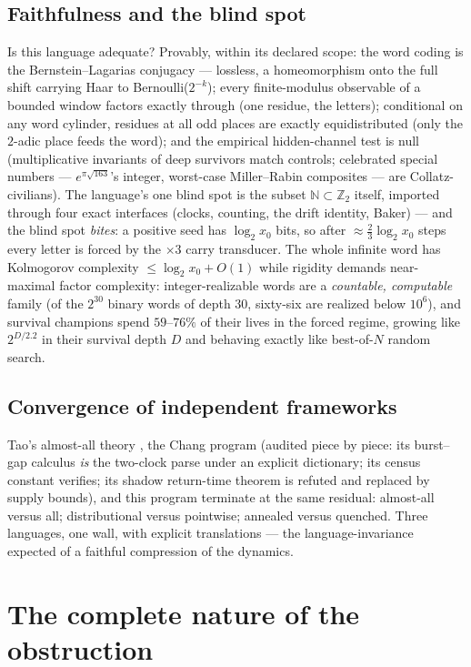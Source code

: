 \documentclass[11pt]{article}
\newcommand{\Z}{\mathbb Z}
\newcommand{\N}{\mathbb N}
\begin{document}
\subsection{Faithfulness and the blind spot}
Is this language adequate?  Provably, within its declared scope: the
word coding is the Bernstein--Lagarias conjugacy
\cite{Bernstein,BernsteinLagarias} --- lossless, a homeomorphism onto
the full shift carrying Haar to Bernoulli($2^{-k}$); every
finite-modulus observable of a bounded window factors exactly through
(one residue, the letters); conditional on any word cylinder, residues
at all odd places are exactly equidistributed (only the $2$-adic place
feeds the word); and the empirical hidden-channel test is null
(multiplicative invariants of deep survivors match controls;
celebrated special numbers --- $e^{\pi\sqrt{163}}$'s integer,
worst-case Miller--Rabin composites --- are Collatz-civilians).  The
language's one blind spot is the subset $\N\subset\Z_2$ itself,
imported through four exact interfaces (clocks, counting, the drift
identity, Baker) --- and the blind spot \emph{bites}: a positive seed
has $\log_2x_0$ bits, so after ${\approx}\tfrac23\log_2x_0$ steps
every letter is forced by the $\times3$ carry transducer.  The whole
infinite word has Kolmogorov complexity $\le\log_2x_0+O(1)$ while
rigidity demands near-maximal factor complexity: integer-realizable
words are a \emph{countable, computable} family (of the $2^{30}$
binary words of depth $30$, sixty-six are realized below $10^6$), and
survival champions spend $59$--$76\%$ of their lives in the forced
regime, growing like $2^{D/2.2}$ in their survival depth $D$ and
behaving exactly like best-of-$N$ random search.

\subsection{Convergence of independent frameworks}
Tao's almost-all theory \cite{Tao}, the Chang program \cite{Chang}
(audited piece by piece: its burst--gap calculus \emph{is} the
two-clock parse under an explicit dictionary; its census constant
verifies; its shadow return-time theorem is refuted and replaced by
supply bounds), and this program terminate at the same residual:
almost-all versus all; distributional versus pointwise; annealed
versus quenched.  Three languages, one wall, with explicit
translations --- the language-invariance expected of a faithful
compression of the dynamics.

\section{The complete nature of the obstruction}
\end{document}
